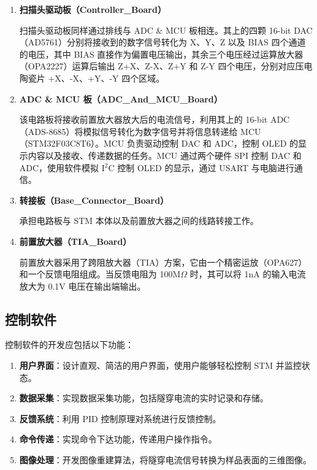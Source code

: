 \documentclass{article}
\begin{document}
\begin{spacing}{1.5}
\begin{enumerate}
		\item \textbf{扫描头驱动板（Controller\_Board）}\par
		\qquad 扫描头驱动板同样通过排线与 ADC \& MCU 板相连。其上的四颗 16-bit DAC（AD5761）分别将接收到的数字信号转化为 X、Y、Z 以及 BIAS 四个通道的电压，其中 BIAS 直接作为偏置电压输出，其余三个电压经过运算放大器（OPA2227）运算后输出 Z+X、Z-X、Z+Y 和 Z-Y 四个电压，分别对应压电陶瓷片 +X、-X、+Y、-Y 四个区域。
		
		\item \textbf{ADC \& MCU 板（ADC\_And\_MCU\_Board）}\par
		\qquad 该电路板将接收前置放大器放大后的电流信号，利用其上的 16-bit ADC（ADS-8685）将模拟信号转化为数字信号并将信息转递给 MCU（STM32F03C8T6）。MCU 负责驱动控制 DAC 和 ADC，控制 OLED 的显示内容以及接收、传递数据的任务。MCU 通过两个硬件 SPI 控制 DAC 和 ADC，使用软件模拟 I$^\text{2}$C 控制 OLED 的显示，通过 USART 与电脑进行通信。
		
		\item \textbf{转接板（Base\_Connector\_Board）}\par
		\qquad 承担电路板与 STM 本体以及前置放大器之间的线路转接工作。
		
		\item \textbf{前置放大器（TIA\_Board）}\par
		\qquad 前置放大器采用了跨阻放大器（TIA）方案，它由一个精密运放（OPA627）和一个反馈电阻组成。当反馈电阻为 100M$\Omega$ 时，其可以将 1nA 的输入电流放大为 0.1V 电压在输出端输出。
		
	\end{enumerate}
	
	
	
	
	
	
	\subsection{控制软件}
	控制软件的开发应包括以下功能：
	\begin{enumerate}
		\item \textbf{用户界面}：设计直观、简洁的用户界面，使用户能够轻松控制 STM 并监控状态。
		\item \textbf{数据采集}：实现数据采集功能，包括隧穿电流的实时记录和存储。
		\item \textbf{反馈系统}：利用 PID 控制原理对系统进行反馈控制。
		\item \textbf{命令传递}：实现命令下达功能，传递用户操作指令。
		\item \textbf{图像处理}：开发图像重建算法，将隧穿电流信号转换为样品表面的三维图像。
	\end{enumerate}
	

\end{spacing}
\end{document}
